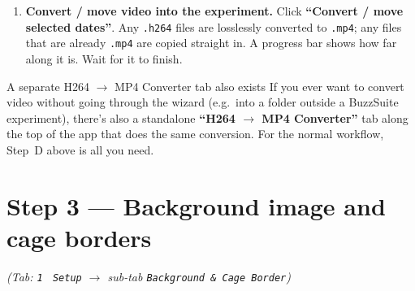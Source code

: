 \documentclass[11pt,a4paper]{article}
\begin{document}
\begin{enumerate}[label=\textbf{\Alph*\ ---}\ ,leftmargin=*,itemsep=8pt]
\begin{treebox}
\ttfamily
\textless your data drive\textgreater\textbackslash Buzzwatch\\
\hspace*{1em}\textbackslash--\ Recording\\
\hspace*{3em}\textbackslash--\ Flare\hfill\textnormal{\itshape\small (= your ``Experiment'' box)}\\
\hspace*{5em}\textbackslash--\ Cakung\hfill\textnormal{\itshape\small (= your ``Incubator'' box)}\\
\hspace*{7em}\textbackslash--\ \textbf{AedesAegyptiM\_21-22}\hfill\textnormal{\itshape\small (= your ``Cage name'' box)}\\
\end{treebox}

You don't need to know or type this path --- BuzzSuite finds your data drive automatically.

  \item \textbf{Convert / move video into the experiment.} Click
        \textbf{``Convert / move selected dates''}. Any \texttt{.h264} files are losslessly
        converted to \texttt{.mp4}; any files that are already \texttt{.mp4} are copied straight
        in. A progress bar shows how far along it is. Wait for it to finish.
\end{enumerate}

\begin{tipbox}{A separate H264 $\to$ MP4 Converter tab also exists}
If you ever want to convert video without going through the wizard (e.g.\ into a folder outside a
BuzzSuite experiment), there's also a standalone \textbf{``H264 $\to$ MP4 Converter''} tab along
the top of the app that does the same conversion. For the normal workflow, Step~D above is all you
need.
\end{tipbox}

\section{Step 3 --- Background image and cage borders}
\textit{(Tab: \texttt{1} \textperiodcentered\ \texttt{Setup} $\to$ sub-tab \texttt{Background \& Cage Border})}
\end{document}
